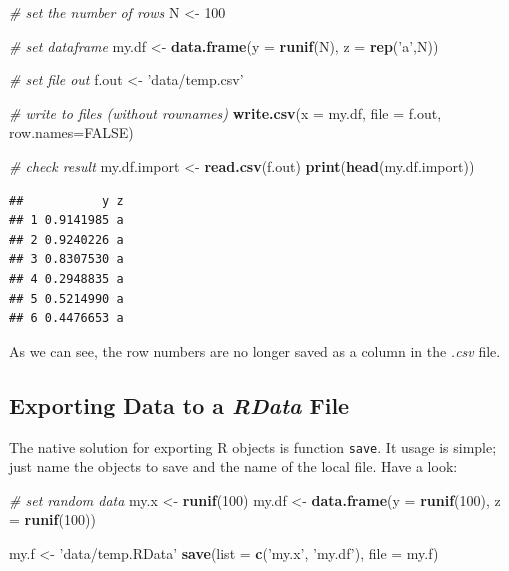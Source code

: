 \documentclass[11pt,]{book}
\newenvironment{Shaded}{\begin{snugshade}}{\end{snugshade}}
\newcommand{\KeywordTok}[1]{\textcolor[rgb]{0.27,0.27,0.27}{\textbf{#1}}}
\newcommand{\DataTypeTok}[1]{\textcolor[rgb]{0.27,0.27,0.27}{#1}}
\newcommand{\DecValTok}[1]{\textcolor[rgb]{0.06,0.06,0.06}{#1}}
\newcommand{\StringTok}[1]{\textcolor[rgb]{0.5,0.5,0.5}{#1}}
\newcommand{\CommentTok}[1]{\textcolor[rgb]{0.56,0.35,0.01}{\textit{#1}}}
\newcommand{\OtherTok}[1]{\textcolor[rgb]{0.56,0.35,0.01}{#1}}
\newcommand{\NormalTok}[1]{#1}
\begin{document}
\begin{Shaded}
\begin{Highlighting}[]
\CommentTok{# set the number of rows}
\NormalTok{N <-}\StringTok{ }\DecValTok{100}

\CommentTok{# set dataframe}
\NormalTok{my.df <-}\StringTok{ }\KeywordTok{data.frame}\NormalTok{(}\DataTypeTok{y =} \KeywordTok{runif}\NormalTok{(N), }\DataTypeTok{z =} \KeywordTok{rep}\NormalTok{(}\StringTok{'a'}\NormalTok{,N))}

\CommentTok{# set file out}
\NormalTok{f.out <-}\StringTok{ 'data/temp.csv'}

\CommentTok{# write to files (without rownames)}
\KeywordTok{write.csv}\NormalTok{(}\DataTypeTok{x =}\NormalTok{ my.df, }\DataTypeTok{file =}\NormalTok{ f.out, }\DataTypeTok{row.names=}\OtherTok{FALSE}\NormalTok{)}

\CommentTok{# check result}
\NormalTok{my.df.import <-}\StringTok{ }\KeywordTok{read.csv}\NormalTok{(f.out)}
\KeywordTok{print}\NormalTok{(}\KeywordTok{head}\NormalTok{(my.df.import))}
\end{Highlighting}
\end{Shaded}

\begin{verbatim}
##           y z
## 1 0.9141985 a
## 2 0.9240226 a
## 3 0.8307530 a
## 4 0.2948835 a
## 5 0.5214990 a
## 6 0.4476653 a
\end{verbatim}

As we can see, the row numbers are no longer saved as a column in the
\emph{.csv} file.

\subsection{\texorpdfstring{Exporting Data to a \emph{RData}
File}{Exporting Data to a RData File}}\label{exporting-data-to-a-rdata-file}

The native solution for exporting R objects is function \texttt{save}.
It usage is simple; just name the objects to save and the name of the
local file. Have a look:

\begin{Shaded}
\begin{Highlighting}[]
\CommentTok{# set random data}
\NormalTok{my.x <-}\StringTok{ }\KeywordTok{runif}\NormalTok{(}\DecValTok{100}\NormalTok{)}
\NormalTok{my.df <-}\StringTok{ }\KeywordTok{data.frame}\NormalTok{(}\DataTypeTok{y =} \KeywordTok{runif}\NormalTok{(}\DecValTok{100}\NormalTok{),}
                    \DataTypeTok{z =} \KeywordTok{runif}\NormalTok{(}\DecValTok{100}\NormalTok{))}

\NormalTok{my.f <-}\StringTok{ 'data/temp.RData'}
\KeywordTok{save}\NormalTok{(}\DataTypeTok{list =} \KeywordTok{c}\NormalTok{(}\StringTok{'my.x'}\NormalTok{, }\StringTok{'my.df'}\NormalTok{),}
     \DataTypeTok{file =}\NormalTok{ my.f)}
\end{Highlighting}
\end{Shaded}
\end{document}
